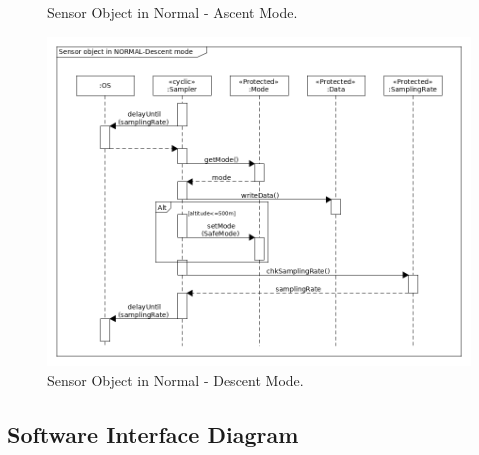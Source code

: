 \documentclass[a4paper,12pt,twoside]{article}
\begin{document}
\begin{appendices}
\begin{landscape}
\begin{figure}[H]
    \caption{Sensor Object in Normal - Ascent Mode.}
    \label{sensorb}
\end{figure}
\begin{figure}[H]
    \centering
    \includegraphics[height=0.9\textwidth]{appendix/img/sensor-dia-seq-c.png}
    \caption{Sensor Object in Normal - Descent Mode.}
    \label{sensorc}
\end{figure}
\end{landscape}
\newpage
\subsection{Software Interface Diagram} \label{sec:appC}

\end{appendices}
\end{document}
